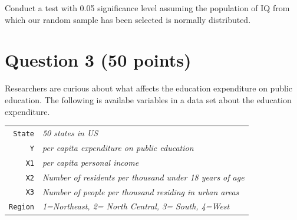 \documentclass[12pt,letterpaper]{article}
\begin{document}
	\noindent Conduct a test with 0.05 significance level assuming the population of IQ from which our random sample has been selected is normally distributed. 
	
	\vspace{1cm}
	
	  
	\vspace{.5cm}
	\section*{Question 3 (50 points)}
	
	\noindent Researchers are curious about what affects the education expenditure on public education. The following is availabe variables in a data set about the education expenditure. \\
	\vspace{.5cm}
	
	
	\begin{tabular}{r|l}
		\texttt{State} &\emph{50 states in US} \\
		\texttt{Y} & \emph{per capita expenditure on public education}\\
		\texttt{X1} &\emph{per capita personal income} \\
		\texttt{X2} &  \emph{Number of residents per thousand under 18 years of age}\\
		\texttt{X3} &  \emph{Number of people per thousand residing in urban areas} \\
		\texttt{Region} &  \emph{1=Northeast, 2= North Central, 3= South, 4=West} \\
	\end{tabular}
	
\end{document}

